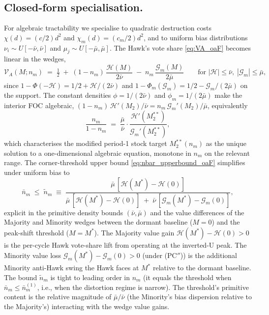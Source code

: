 \documentclass[11pt,twoside]{extarticle}
\begin{document}
\subsection*{Closed-form specialisation.} For algebraic tractability we specialise to quadratic destruction costs $\chi(d)=(c/2)d^2$ and $\chi_m(d)=(c_m/2)d^2$, and to uniform bias distributions $\nu_i\sim U[-\bar\nu,\bar\nu]$ and $\mu_j\sim U[-\bar\mu,\bar\mu]$. The Hawk's vote share \autoref{eq:VA_oaF} becomes linear in the wedges,
\begin{equation}\label{eq:VA_uniform_oaF}
    \mathcal V_A(M;n_m)\;=\;\tfrac12\;+\;(1-n_m)\,\frac{\mathcal H(M)}{2\bar\nu}\;-\;n_m\,\frac{\mathcal G_m(M)}{2\bar\mu}\qquad\text{for }|\mathcal H|\le\bar\nu,\;|\mathcal G_m|\le\bar\mu,
\end{equation}
since $1-\Phi(-\mathcal H)=1/2+\mathcal H/(2\bar\nu)$ and $1-\Phi_m(\mathcal G_m)=1/2-\mathcal G_m/(2\bar\mu)$ on the support. The constant densities $\phi=1/(2\bar\nu)$ and $\phi_m=1/(2\bar\mu)$ make the interior FOC algebraic, $(1-n_m)\,\mathcal H'(M_2)/\bar\nu=n_m\,\mathcal G_m'(M_2)/\bar\mu$, equivalently
\begin{equation}\label{eq:FOC_uniform_oaF}
    \frac{n_m}{1-n_m}\;=\;\frac{\bar\mu}{\bar\nu}\cdot\frac{\mathcal H'(M_2^{**})}{\mathcal G_m'(M_2^{**})},
\end{equation}
which characterises the modified period-1 stock target $M_2^{**}(n_m)$ as the unique solution to a one-dimensional algebraic equation, monotone in $n_m$ on the relevant range. The corner-threshold upper bound \autoref{eq:nbar_upperbound_oaF} simplifies under uniform bias to
\begin{equation}\label{eq:nbar_uniform_oaF}
    \bar n_m\;\le\;\widetilde n_m\;\equiv\;\frac{\bar\mu\,[\mathcal H(M^{*})-\mathcal H(0)]}{\bar\mu\,[\mathcal H(M^{*})-\mathcal H(0)]\;+\;\bar\nu\,[\mathcal G_m(M^{*})-\mathcal G_m(0)]},
\end{equation}
explicit in the primitive density bounds $(\bar\nu,\bar\mu)$ and the value differences of the Majority and Minority wedges between the dormant baseline ($M=0$) and the peak-shift threshold ($M=M^{*}$). The Majority value gain $\mathcal H(M^{*})-\mathcal H(0)>0$ is the per-cycle Hawk vote-share lift from operating at the inverted-U peak. The Minority value loss $\mathcal G_m(M^{*})-\mathcal G_m(0)>0$ (under (PC$''$)) is the additional Minority anti-Hawk swing the Hawk faces at $M^{*}$ relative to the dormant baseline. The bound $\widetilde n_m$ is tight to leading order in $n_m$ (it equals the threshold when $\bar n_m\le\bar n_m^{(1)}$, i.e., when the distortion regime is narrow). The threshold's primitive content is the relative magnitude of $\bar\mu/\bar\nu$ (the Minority's bias dispersion relative to the Majority's) interacting with the wedge value gains.
\end{document}
